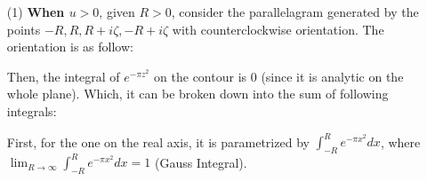 \documentclass{article}
\begin{document}
\begin{itemize}
    \item[(1)] \textbf{When $u>0$}, given $R>0$, consider the parallelagram generated by the points $-R,R,R+i\zeta,-R+i\zeta$ with counterclockwise orientation. The orientation is as follow:
    
    \begin{center}
    \end{center}

    Then, the integral of $e^{-\pi z^2}$ on the contour is $0$ (since it is analytic on the whole plane). Which, it can be broken down into the sum of following integrals:

    \hfil

    First, for the one on the real axis, it is parametrized by $\int_{-R}^{R}e^{-\pi x^2}dx$, where $\lim_{R\rightarrow\infty}\int_{-R}^{R}e^{-\pi x^2}dx=1$ (Gauss Integral).

    \hfil


\end{itemize}
\end{document}
